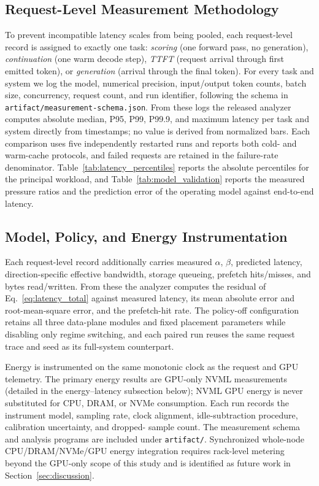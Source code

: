 \subsection{Request-Level Measurement Methodology}
\label{sec:latency_protocol}
To prevent incompatible latency scales from being pooled, each request-level
record is assigned to exactly one task: \emph{scoring} (one forward pass, no
generation), \emph{continuation} (one warm decode step), \emph{TTFT} (request
arrival through first emitted token), or \emph{generation} (arrival through the
final token).  For every task and system we log the model, numerical precision,
input/output token counts, batch size, concurrency, request count, and run
identifier, following the schema in \texttt{artifact/measurement-schema.json}.
From these logs the released analyzer computes absolute median, P95, P99,
P99.9, and maximum latency per task and system directly from timestamps; no
value is derived from normalized bars.  Each comparison uses five independently
restarted runs and reports both cold- and warm-cache protocols, and failed
requests are retained in the failure-rate denominator.
Table~\ref{tab:latency_percentiles} reports the absolute percentiles for the
principal workload, and Table~\ref{tab:model_validation} reports the measured
pressure ratios and the prediction error of the operating model against
end-to-end latency.




\subsection{Model, Policy, and Energy Instrumentation}
Each request-level record additionally carries measured $\alpha$, $\beta$,
predicted latency, direction-specific effective bandwidth, storage queueing,
prefetch hits/misses, and bytes read/written.  From these the analyzer computes
the residual of Eq.~\eqref{eq:latency_total} against measured latency, its mean
absolute error and root-mean-square error, and the prefetch-hit rate.  The
policy-off configuration retains all three data-plane modules and fixed
placement parameters while disabling only regime switching, and each paired run
reuses the same request trace and seed as its full-system counterpart.

Energy is instrumented on the same monotonic clock as the request and GPU
telemetry.  The primary energy results are GPU-only NVML measurements (detailed
in the energy--latency subsection below); NVML GPU energy is never substituted
for CPU, DRAM, or NVMe consumption.  Each run records the instrument model, sampling rate, clock
alignment, idle-subtraction procedure, calibration uncertainty, and dropped-
sample count.  The measurement schema and analysis programs are included under
\texttt{artifact/}.  Synchronized whole-node CPU/DRAM/NVMe/GPU energy
integration requires rack-level metering beyond the GPU-only scope of this
study and is identified as future work in Section~\ref{sec:discussion}.

